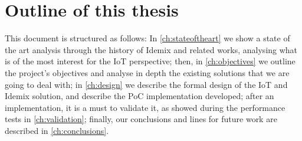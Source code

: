 \hfil


\section{Outline of this thesis}

This document is structured as follows: In \autoref{ch:stateoftheart} we show a state of the art analysis through the history of Idemix and related works, analysing what is of the most interest for the IoT perspective; then, in \autoref{ch:objectives} we outline the project's objectives and analyse in depth the existing solutions that we are going to deal with; in \autoref{ch:design} we describe the formal design of the IoT and Idemix solution, and describe the PoC implementation developed; after an implementation, it is a must to validate it, as showed during the performance tests in \autoref{ch:validation}; finally, our conclusions and lines for future work are described in \autoref{ch:conclusions}.


